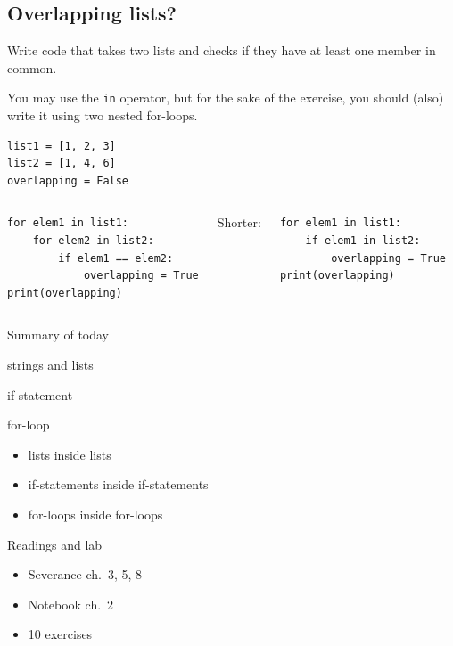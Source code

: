 \documentclass[aspectratio=169,usenames,dvipsnames]{beamer}
\begin{document}
\subsection{Overlapping lists?}
\begin{frame}[fragile]
    Write code that takes two lists and checks if they have at least one
    member in common.

    \vspace{1em}
    You may use the \lstinline{in} operator, but for the sake of the
    exercise, you should (also) write it using two nested for-loops.
\begin{lstlisting}
list1 = [1, 2, 3]
list2 = [1, 4, 6]
overlapping = False
\end{lstlisting}
\pause
\begin{columns}[T]
\begin{lstlisting}
for elem1 in list1:
    for elem2 in list2:
        if elem1 == elem2:
            overlapping = True
print(overlapping)
\end{lstlisting}
\pause
{}
Shorter:
\begin{lstlisting}
for elem1 in list1:
    if elem1 in list2:
        overlapping = True
print(overlapping)
\end{lstlisting}
\end{columns}
\end{frame}

\begin{frame}{Summary of today}
    \begin{description}
        \item[Sequence types] strings and lists
        \item[Conditions] if-statement
        \item[Repetition] for-loop
        \item[Nesting]
            \begin{itemize}
                \item lists inside lists
                \item if-statements inside if-statements
                \item for-loops inside for-loops
            \end{itemize}
    \end{description}
\end{frame}


\begin{frame}{Readings and lab}
    \begin{itemize}
        \item Severance ch.\ 3, 5, 8
        \item Notebook ch.\ 2
        \item 10 exercises
    \end{itemize}
\end{frame}
\end{document}
